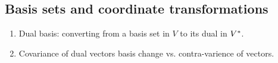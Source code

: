 \subsection{Basis sets and coordinate transformations}
\begin{enumerate}
    \item Dual basis: converting from a basis set in $V$ to its dual in $V^{*}$.
    \item Covariance of dual vectors basis change vs. contra-varience of vectors.
\end{enumerate}

